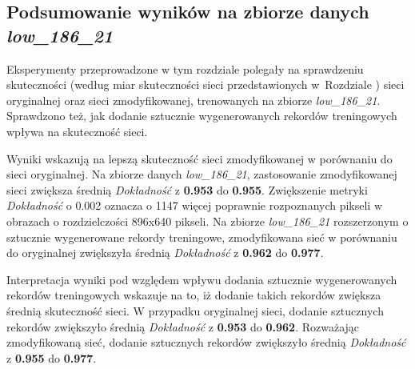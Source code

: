 \subsection{Podsumowanie wyników na zbiorze danych \textit{low\_186\_21}}
Eksperymenty przeprowadzone w tym rozdziale polegały na sprawdzeniu skuteczności (według miar skuteczności sieci przedstawionych w~Rozdziale ) sieci oryginalnej oraz sieci zmodyfikowanej, trenowanych na zbiorze \textit{low\_186\_21}.
Sprawdzono też, jak dodanie sztucznie wygenerowanych rekordów treningowych wpływa na skuteczność sieci.


Wyniki wskazują na lepszą skuteczność sieci zmodyfikowanej w porównaniu do sieci oryginalnej.
Na zbiorze danych \textit{low\_186\_21}, zastosowanie zmodyfikowanej sieci zwiększa średnią \textit{Dokładność} z \textbf{0.953} do \textbf{0.955}.
Zwiększenie metryki \textit{Dokładność} o 0.002 oznacza o 1147 więcej poprawnie rozpoznanych pikseli w obrazach o rozdzielczości 896x640 pikseli. Na zbiorze \textit{low\_186\_21} rozszerzonym o sztucznie wygenerowane rekordy treningowe, zmodyfikowana sieć w porównaniu do oryginalnej zwiększyła średnią \textit{Dokładność} z \textbf{0.962} do \textbf{0.977}.


Interpretacja wyniki pod względem wpływu dodania sztucznie wygenerowanych rekordów treningowych wskazuje na to, iż dodanie takich rekordów zwiększa średnią skuteczność sieci. W przypadku oryginalnej sieci, dodanie sztucznych rekordów zwiększyło średnią \textit{Dokładność} z \textbf{0.953} do \textbf{0.962}. Rozważając zmodyfikowaną sieć, dodanie sztucznych rekordów zwiększyło średnią \textit{Dokładność} z \textbf{0.955} do \textbf{0.977}.
